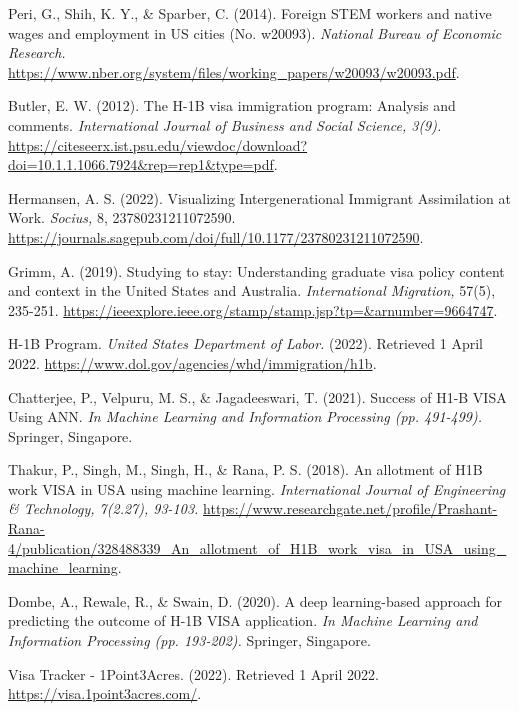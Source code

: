 \documentclass[sigconf]{acmart}
\begin{document}
\begin{thebibliography}{12}

\bibitem{}

\textit{}
Peri, G., Shih, K. Y., \& Sparber, C. 
(2014). 
Foreign STEM workers and native wages and employment in US cities (No. w20093). 
\textit{National Bureau of Economic Research. }
\url{https://www.nber.org/system/files/working_papers/w20093/w20093.pdf}.

\bibitem{}
Butler, E. W. 
(2012). 
The H-1B visa immigration program: Analysis and comments. 
\textit{International Journal of Business and Social Science, 3(9).}
\url{https://citeseerx.ist.psu.edu/viewdoc/download?doi=10.1.1.1066.7924&rep=rep1&type=pdf}.


\bibitem{}
Hermansen, A. S. 
(2022). 
Visualizing Intergenerational Immigrant Assimilation at Work. 
\textit{Socius,} 8, 23780231211072590.
\url{https://journals.sagepub.com/doi/full/10.1177/23780231211072590}.

\bibitem{}
Grimm, A. 
(2019). 
Studying to stay: Understanding graduate visa policy content and context in the United States and Australia. 
\textit{International Migration,} 57(5), 235-251. 
\url{https://ieeexplore.ieee.org/stamp/stamp.jsp?tp=&arnumber=9664747}.

\bibitem{} 
	H-1B Program. 
\textit{United States Department of Labor.} 
(2022). 
Retrieved 1 April 2022. 
\url{https://www.dol.gov/agencies/whd/immigration/h1b}.

\bibitem{}
Chatterjee, P., Velpuru, M. S., \& Jagadeeswari, T. 
(2021). 
Success of H1-B VISA Using ANN. 
\textit{In Machine Learning and Information Processing (pp. 491-499).}
 Springer, Singapore.

\bibitem{}
Thakur, P., Singh, M., Singh, H., \& Rana, P. S. 
(2018). 
An allotment of H1B work VISA in USA using machine learning. 
\textit{International Journal of Engineering \& Technology, 7(2.27), 93-103. }
\url{https://www.researchgate.net/profile/Prashant-Rana-4/publication/328488339_An_allotment_of_H1B_work_visa_in_USA_using_machine_learning}.

\bibitem{}
Dombe, A., Rewale, R., \& Swain, D. 
(2020). 
A deep learning-based approach for predicting the outcome of H-1B VISA application. 
\textit{In Machine Learning and Information Processing (pp. 193-202).}
 Springer, Singapore.

\bibitem{}
Visa Tracker - 1Point3Acres. 
(2022). 
Retrieved 1 April 2022.  
\\\url{https://visa.1point3acres.com/}.


\end{thebibliography}
\end{document}
